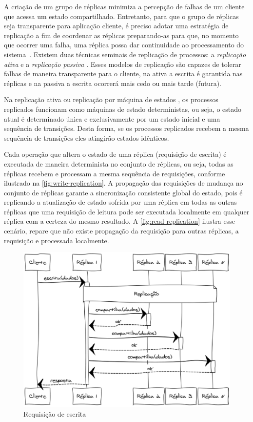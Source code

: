A criação de um grupo de réplicas minimiza a percepção de falhas de um cliente que acessa
um estado compartilhado. Entretanto, para que o grupo de réplicas seja transparente para
aplicação cliente, é preciso adotar uma estratégia de replicação a fim de coordenar as
réplicas preparando-as para que, no momento que ocorrer uma falha, uma réplica possa dar
continuidade ao processamento do sistema~\cite{jalote94}. Existem duas técnicas seminais
de replicação de processos: a \emph{replicação ativa} e a \emph{replicação passiva}
\cite{jalote94}. Esses modelos de replicação são capazes de tolerar falhas de maneira
transparente para o cliente, na ativa a escrita é garantida nas réplicas e na passiva a
escrita ocorrerá mais cedo ou mais tarde (futura).

Na replicação ativa \cite{coulouris11, guerraoui97} ou replicação por máquina de estados
\cite{schneider90}, os processos replicados funcionam como máquinas de estado
deterministas, ou seja, o estado atual é determinado única e exclusivamente por um estado
inicial e uma sequência de transições. Desta forma, se os processos replicados recebem a
mesma sequência de transições eles atingirão estados idênticos.

Cada operação que altera o estado de uma réplica (requisição de escrita) é executada de
maneira determinista no conjunto de réplicas, ou seja, todas as réplicas recebem e
processam a mesma sequência de requisições, conforme ilustrado na
\autoref{fig:write-replication}. A propagação das requisições de mudança no conjunto de
réplicas garante a sincronização consistente global do estado, pois é replicando a
atualização de estado sofrida por uma réplica em todas as outras réplicas que uma
requisição de leitura pode ser executada localmente em qualquer réplica com a certeza do
mesmo resultado. A \autoref{fig:read-replication} ilustra esse cenário, repare que não
existe propagação da requisição para outras réplicas, a requisição e processada
localmente.

\begin{figure}[htbp]
  \centering
  \includegraphics[width=14.5cm]{conteudo/capitulos/figuras/escrita_replicacao.eps}
  \caption{Requisição de escrita}
  \label{fig:write-replication}
\end{figure}

